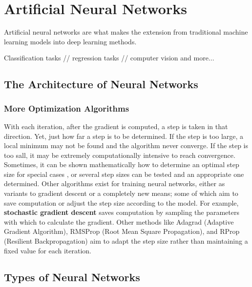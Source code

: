 \chapter{Artificial Neural Networks}

Artificial neural networks are what makes the extension from traditional machine learning models into deep learning methods.

Classification tasks // regression tasks // computer vision and more...

\section{The Architecture of Neural Networks} %

  


\subsection{More Optimization Algorithms}

With each iteration, after the gradient is computed, a step is taken in that direction.  Yet, just how far a step is to be determined.  If the step is too large, a local minimum may not be found and the algorithm never converge.  If the step is too sall, it may be extremely computationally intensive to reach convergence.  Sometimes, it can be shown mathematically how to determine an optimal step size for special cases \cite{nar2018step}, or several step sizes can be tested \cite{Goodfellow-et-al-2016} and an appropriate one determined.  Other algorithms exist for training neural networks, either as variants to gradient descent or a completely new means; some of which aim to save computation or adjust the step size according to the model.  For example, \textbf{stochastic gradient descent} saves computation by sampling the parameters with which to calculate the gradient.  Other methods like Adagrad (Adaptive Gradient Algorithm), RMSProp (Root Mean Square Propagation), and RProp (Resilient Backpropagation)\cite{rproprprop} aim to adapt the step size rather than maintaining a fixed value for each iteration.

\section{Types of Neural Networks} %




